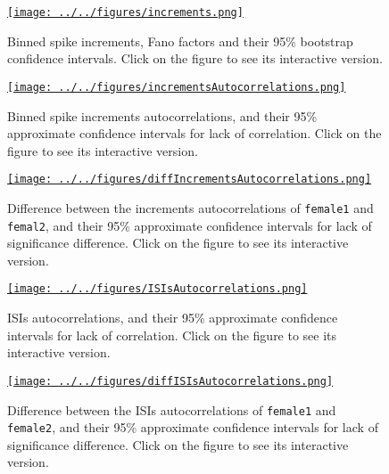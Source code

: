 \documentclass[10pt]{article}
\begin{document}
\begin{figure}
    \href{http://www.gatsby.ucl.ac.uk/~rapela/singleNeuronSpikesAnalysisTutorial/figures/increments.html}{\texttt{[image: ../../figures/increments.png]}}
    \caption{Binned spike increments, Fano factors and their 95\% bootstrap confidence intervals. Click on the figure to see its interactive version.}
    \label{fig:increments}
\end{figure}

\begin{figure}
    \href{http://www.gatsby.ucl.ac.uk/~rapela/singleNeuronSpikesAnalysisTutorial/figures/incrementsAutocorrelations.html}{\texttt{[image: ../../figures/incrementsAutocorrelations.png]}}
    \caption{Binned spike increments autocorrelations, and their 95\% approximate confidence intervals for lack of correlation. Click on the figure to see its interactive version.}
    \label{fig:incrementsAutocorrelations}
\end{figure}

\begin{figure}
    \href{http://www.gatsby.ucl.ac.uk/~rapela/singleNeuronSpikesAnalysisTutorial/figures/diffIncrementsAutocorrelations.html}{\texttt{[image: ../../figures/diffIncrementsAutocorrelations.png]}}
    \caption{Difference between the increments autocorrelations of \texttt{female1} and \texttt{femal2}, and their 95\% approximate confidence intervals for lack of significance difference. Click on the figure to see its interactive version.}
    \label{fig:diffIncrementsAutocorrelations}
\end{figure}

\begin{figure}
    \href{http://www.gatsby.ucl.ac.uk/~rapela/singleNeuronSpikesAnalysisTutorial/figures/ISIsAutocorrelations.html}{\texttt{[image: ../../figures/ISIsAutocorrelations.png]}}
    \caption{ISIs autocorrelations, and their 95\% approximate confidence intervals for lack of correlation. Click on the figure to see its interactive version.}
    \label{fig:ISIsAutocorrelations}
\end{figure}

\begin{figure}
    \href{http://www.gatsby.ucl.ac.uk/~rapela/singleNeuronSpikesAnalysisTutorial/figures/diffISIsAutocorrelations.html}{\texttt{[image: ../../figures/diffISIsAutocorrelations.png]}}
    \caption{Difference between the ISIs autocorrelations of \texttt{female1} and \texttt{female2}, and their 95\% approximate confidence intervals for lack of significance difference. Click on the figure to see its interactive version.}
    \label{fig:diffISIsAutocorrelations}
\end{figure}
\end{document}
